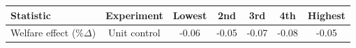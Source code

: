 \begin{table}[p]
\footnotesize
\renewcommand{\arraystretch}{1.2}
\begin{center}
\begin{tabular}{lcccccc}
\toprule
Statistic & Experiment & Lowest & 2nd & 3rd & 4th & Highest\\ 
\midrule
Welfare effect ($\% \Delta$) & Unit control & -0.06 & -0.05 & -0.07 & -0.08 & 
-0.05 \\
\bottomrule
\bottomrule
\end{tabular}
\end{center}
\normalsize
\end{table}
